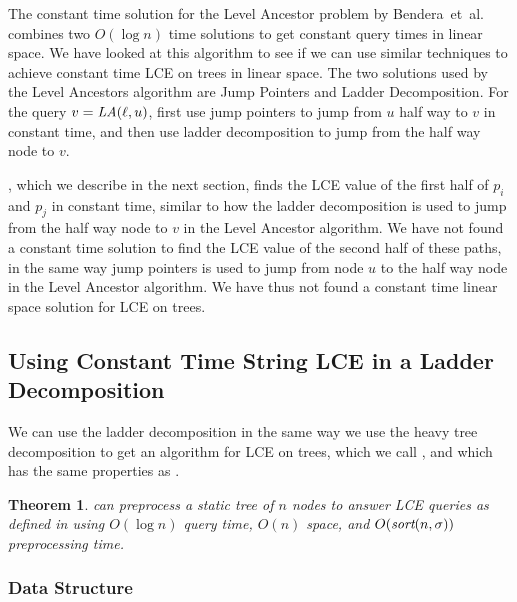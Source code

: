 \documentclass[a4]{article}
\newcommand*{\pref}{\prettyref}
\newtheorem{theorem}{Theorem}
\begin{document}
The constant time solution for the Level Ancestor problem by Bendera~et~al.~\cite{level-ancestor} combines two $O(\log n)$ time solutions to get constant query times in linear space. We have looked at this algorithm to see if we can use similar techniques to achieve constant time LCE on trees in linear space. The two solutions used by the Level Ancestors algorithm are Jump Pointers and Ladder Decomposition. For the query $v=\textit{LA}(\ell,u)$, first use jump pointers to jump from $u$ half way to $v$ in constant time, and then use ladder decomposition to jump from the half way node to $v$.

, which we describe in the next section, finds the LCE value of the first half of $p_i$ and $p_j$ in constant time, similar to how the ladder decomposition is used to jump from the half way node to $v$ in the Level Ancestor algorithm. We have not found a constant time solution to find the LCE value of the second half of these paths, in the same way jump pointers is used to jump from node $u$ to the half way node in the Level Ancestor algorithm. We have thus not found a constant time linear space solution for LCE on trees.

\subsection{Using Constant Time String LCE in a Ladder Decomposition}

We can use the ladder decomposition in the same way we use the heavy tree decomposition to get an algorithm for LCE on trees, which we call , and which has the same properties as .

\begin{theorem}
 can preprocess a static tree of $n$ nodes to answer LCE queries as defined in \pref{sec:tree-def} using $O(\log n)$ query time, $O(n)$ space, and $O(\textit{sort}(n,\sigma))$ preprocessing time.
\end{theorem}

\subsubsection{Data Structure}
\end{document}
